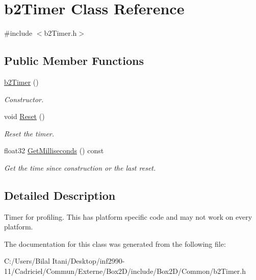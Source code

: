 \hypertarget{classb2_timer}{}\section{b2\+Timer Class Reference}
\label{classb2_timer}


{\ttfamily \#include $<$b2\+Timer.\+h$>$}

\subsection*{Public Member Functions}
\begin{DoxyCompactItemize}
\item 
\hyperlink{classb2_timer_afcc159032a8edeaa9febdf2b6cbd49a5}{b2\+Timer} ()\hypertarget{classb2_timer_afcc159032a8edeaa9febdf2b6cbd49a5}{}\label{classb2_timer_afcc159032a8edeaa9febdf2b6cbd49a5}

\begin{DoxyCompactList}\small\item\em Constructor. \end{DoxyCompactList}\item 
void \hyperlink{classb2_timer_a367388794588e9283600437be82f2889}{Reset} ()\hypertarget{classb2_timer_a367388794588e9283600437be82f2889}{}\label{classb2_timer_a367388794588e9283600437be82f2889}

\begin{DoxyCompactList}\small\item\em Reset the timer. \end{DoxyCompactList}\item 
float32 \hyperlink{classb2_timer_a354e020ec583a067b8f3b90a42a88e53}{Get\+Milliseconds} () const \hypertarget{classb2_timer_a354e020ec583a067b8f3b90a42a88e53}{}\label{classb2_timer_a354e020ec583a067b8f3b90a42a88e53}

\begin{DoxyCompactList}\small\item\em Get the time since construction or the last reset. \end{DoxyCompactList}\end{DoxyCompactItemize}


\subsection{Detailed Description}
Timer for profiling. This has platform specific code and may not work on every platform. 

The documentation for this class was generated from the following file\+:\begin{DoxyCompactItemize}
\item 
C\+:/\+Users/\+Bilal Itani/\+Desktop/inf2990-\/11/\+Cadriciel/\+Commun/\+Externe/\+Box2\+D/include/\+Box2\+D/\+Common/b2\+Timer.\+h\end{DoxyCompactItemize}
